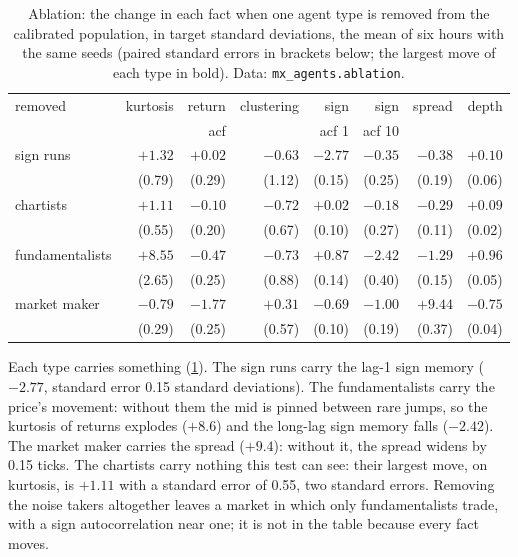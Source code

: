 \begin{table}[ht]
\centering
\small
\begin{tabular}{@{}lrrrrrrr@{}}
\toprule
removed & kurtosis & return & clustering & sign & sign & spread & depth \\
 & & acf & & acf 1 & acf 10 & & \\
\midrule
sign runs & $+1.32$ & $+0.02$ & $-0.63$ & $\mathbf{-2.77}$ & $-0.35$ & $-0.38$ & $+0.10$ \\
 & (0.79) & (0.29) & (1.12) & (0.15) & (0.25) & (0.19) & (0.06) \\[2pt]
chartists & $\mathbf{+1.11}$ & $-0.10$ & $-0.72$ & $+0.02$ & $-0.18$ & $-0.29$ & $+0.09$ \\
 & (0.55) & (0.20) & (0.67) & (0.10) & (0.27) & (0.11) & (0.02) \\[2pt]
fundamentalists & $\mathbf{+8.55}$ & $-0.47$ & $-0.73$ & $+0.87$ & $-2.42$ & $-1.29$ & $+0.96$ \\
 & (2.65) & (0.25) & (0.88) & (0.14) & (0.40) & (0.15) & (0.05) \\[2pt]
market maker & $-0.79$ & $-1.77$ & $+0.31$ & $-0.69$ & $-1.00$ & $\mathbf{+9.44}$ & $-0.75$ \\
 & (0.29) & (0.25) & (0.57) & (0.10) & (0.19) & (0.37) & (0.04) \\[2pt]
\bottomrule
\end{tabular}
\caption{Ablation: the change in each fact when one agent type is removed from the calibrated population, in target standard deviations, the mean of
six hours with the same seeds (paired standard errors in brackets below; the largest move of each type in bold). Data:
\texttt{mx\_agents.ablation}.}\label{tab:mx:build-an-agent-based-market:abl}
\end{table}

Each type carries something (\cref{tab:mx:build-an-agent-based-market:abl}). The sign runs carry the lag-1 sign memory ($-2.77$, standard error 0.15 standard deviations).
The fundamentalists carry the price's movement: without them the mid is pinned between rare jumps, so the kurtosis of returns explodes ($+8.6$) and the
long-lag sign memory falls ($-2.42$). The market maker carries the spread ($+9.4$): without it, the spread widens by 0.15 ticks. The chartists
carry nothing this test can see: their largest move, on kurtosis, is $+1.11$ with a standard error of 0.55, two standard errors. Removing the noise takers altogether leaves a market in
which only fundamentalists trade, with a sign autocorrelation near one; it is not in the table because every fact moves.

